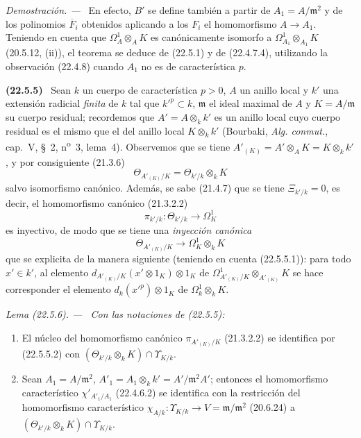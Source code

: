 \documentclass[10pt,oneside]{book}
\makeatletter
\newcommand{\setmanualcurrentlabel}[1]{\def\@currentlabel{#1}}
\newcommand{\oldpage}[2][]{%
  \setcounter{footnote}{0}%
  \marginpar{\scriptsize\textbf{#1}~|~#2}\ignorespaces}
\newenvironment{env}[1][]{\setmanualcurrentlabel{#1}\par\medskip\noindent\textbf{(#1)}\ }{\par}
\newenvironment{lemma}[1][]{%
  \setmanualcurrentlabel{#1}\par\medskip\noindent\itshape Lema (#1). ---\ }{\par}
\newenvironment{proof}{%
  \par\medskip\noindent\textit{Demostración. ---\ }}{\par}
\makeatother
\begin{document}
\begin{proof}
En efecto, $B'$ se define también a partir de $A_1=A/\mathfrak m^2$ y de los
polinomios $\overline F_i$ obtenidos aplicando a los $F_i$ el homomorfismo
$A\longrightarrow A_1$. Teniendo en cuenta que $\Omega^1_A\otimes_AK$ es
canónicamente isomorfo a $\Omega^1_{A_1}\otimes_{A_1}K$ (20.5.12, (ii)), el
teorema se deduce de (22.5.1) y de (22.4.7.4), utilizando la observación
(22.4.8) cuando $A_1$ no es de característica $p$.
\end{proof}

\oldpage[0\textsubscript{IV-1}]{203}

\begin{env}[22.5.5]
\label{0.22.5.5-es}
Sean $k$ un cuerpo de característica $p>0$, $A$ un anillo local y $k'$ una
extensión radicial \emph{finita} de $k$ tal que $k'^p\subset k$,
$\mathfrak m$ el ideal maximal de $A$ y $K=A/\mathfrak m$ su cuerpo residual;
recordemos que $A'=A\otimes_kk'$ es un anillo local cuyo cuerpo residual es
el mismo que el del anillo local $K\otimes_kk'$ (Bourbaki,
\emph{Alg. conmut.}, cap.~V, §~2, n\textsuperscript{o}~3, lema~4). Observemos que
se tiene $A'_{(K)}=A'\otimes_AK=K\otimes_kk'$, y por consiguiente (21.3.6)
\begin{equation}
\label{0.22.5.5.1-es}
  \Theta_{A'_{(K)}/K}=\Theta_{k'/k}\otimes_kK
  \tag{22.5.5.1}
\end{equation}
salvo isomorfismo canónico. Además, se sabe (21.4.7) que se tiene
$\Xi_{k'/k}=0$, es decir, el homomorfismo canónico (21.3.2.2)
\[
  \pi_{k'/k}:\Theta_{k'/k}\longrightarrow\Omega^1_K
\]
es inyectivo, de modo que se tiene una \emph{inyección canónica}
\begin{equation}
\label{0.22.5.5.2-es}
  \Theta_{A'_{(K)}/K}\longrightarrow\Omega^1_K\otimes_kK
  \tag{22.5.5.2}
\end{equation}
que se explicita de la manera siguiente (teniendo en cuenta (22.5.5.1)): para todo
$x'\in k'$, al elemento
$d_{A'_{(K)}/K}(x'\otimes1_K)\otimes1_K$ de
$\Omega^1_{A'_{(K)}/K}\otimes_{A'_{(K)}}K$ se hace corresponder el elemento
$d_k(x'^p)\otimes1_K$ de $\Omega^1_k\otimes_kK$.
\end{env}

\begin{lemma}[22.5.6]
\label{0.22.5.6-es}
Con las notaciones de \textup{(22.5.5)}:
\begin{enumerate}
  \item[\rm(i)] El núcleo del homomorfismo canónico
  $\pi_{A'_{(K)}/K}$ \textup{(21.3.2.2)} se identifica por \textup{(22.5.5.2)} con
  $(\Theta_{k'/k}\otimes_kK)\cap\Upsilon_{K/k}$.
  \item[\rm(ii)] Sean $A_1=A/\mathfrak m^2$,
  $A'_1=A_1\otimes_kk'=A'/\mathfrak m^2A'$; entonces el homomorfismo
  característico $\chi'_{A'_1/A_1}$ \textup{(22.4.6.2)} se identifica con la restricción del
  homomorfismo característico
  $\chi_{A/k}:\Upsilon_{K/k}\longrightarrow V=\mathfrak m/\mathfrak m^2$
  \textup{(20.6.24)} a $(\Theta_{k'/k}\otimes_kK)\cap\Upsilon_{K/k}$.
\end{enumerate}
\end{lemma}
\end{document}
